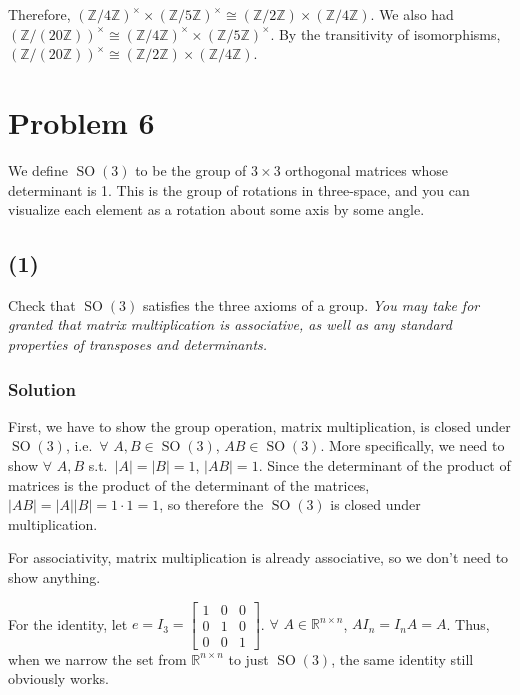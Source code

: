 \documentclass[fleqn]{article}
\DeclareMathOperator{\SO}{SO}
\begin{document}
        Therefore, $(\mathbb{Z}/4\mathbb{Z})^\times \times (\mathbb{Z}/5\mathbb{Z})^\times \cong (\mathbb{Z}/2\mathbb{Z}) \times (\mathbb{Z}/4\mathbb{Z})$.  We also had $(\mathbb{Z}/(20\mathbb{Z}))^\times \cong (\mathbb{Z}/4\mathbb{Z})^\times \times (\mathbb{Z}/5\mathbb{Z})^\times$.  By the transitivity of isomorphisms, $(\mathbb{Z}/(20\mathbb{Z}))^\times \cong (\mathbb{Z}/2\mathbb{Z}) \times (\mathbb{Z}/4\mathbb{Z})$.
    
    \section{Problem 6}
    We define $\SO(3)$ to be the group of $3 \times 3$ orthogonal matrices whose determinant is 1.  This is the group of rotations in three-space, and you can visualize each element as a rotation about some axis by some angle.
        
        \subsection{(1)}
        Check that $\SO(3)$ satisfies the three axioms of a group.  \textit{You may take for granted that matrix multiplication is associative, as well as any standard properties of transposes and determinants.}
            
            \subsubsection{Solution}
                First, we have to show the group operation, matrix multiplication, is closed under $\SO(3)$, i.e.\ $\forall$ $A, B \in \SO(3)$, $AB \in \SO(3)$.  More specifically, we need to show $\forall$ $A, B$ s.t.\ $|A| = |B| = 1$, $|AB| = 1$.  Since the determinant of the product of matrices is the product of the determinant of the matrices, $|AB| = |A||B| = 1 \cdot 1 = 1$, so therefore the $\SO(3)$ is closed under multiplication.
                
                For associativity, matrix multiplication is already associative, so we don't need to show anything.
                
                For the identity, let $e = I_3 = \begin{bmatrix}
                    1 & 0 & 0 \\
                    0 & 1 & 0 \\
                    0 & 0 & 1
                \end{bmatrix}$.  $\forall$ $A \in \mathbb{R}^{n \times n}$, $AI_n = I_nA = A$.  Thus, when we narrow the set from $\mathbb{R}^{n \times n}$ to just $\SO(3)$, the same identity still obviously works.
                
\end{document}
